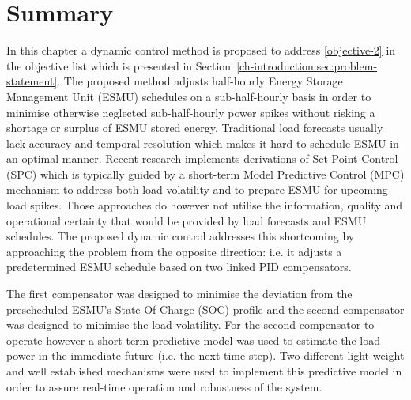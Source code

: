 \section{Summary}
\label{ch2:sec:summary}

In this chapter a dynamic control method is proposed to address \ref{objective-2} in the objective list which is presented in Section~\ref{ch-introduction:sec:problem-statement}.
The proposed method adjusts half-hourly Energy Storage Management Unit (ESMU) schedules on a sub-half-hourly basis in order to minimise otherwise neglected sub-half-hourly power spikes without risking a shortage or surplus of ESMU stored energy.
Traditional load forecasts usually lack accuracy and temporal resolution which makes it hard to schedule ESMU in an optimal manner.
Recent research implements derivations of Set-Point Control (SPC) which is typically guided by a short-term Model Predictive Control (MPC) mechanism to address both load volatility and to prepare ESMU for upcoming load spikes.
Those approaches do however not utilise the information, quality and operational certainty that would be provided by load forecasts and ESMU schedules.
The proposed dynamic control addresses this shortcoming by approaching the problem from the opposite direction: i.e. it adjusts a predetermined ESMU schedule based on two linked PID compensators.

The first compensator was designed to minimise the deviation from the prescheduled ESMU's State Of Charge (SOC) profile and the second compensator was designed to minimise the load volatility.
For the second compensator to operate however a short-term predictive model was used to estimate the load power in the immediate future (i.e. the next time step).
Two different light weight and well established mechanisms were used to implement this predictive model in order to assure real-time operation and robustness of the system.

